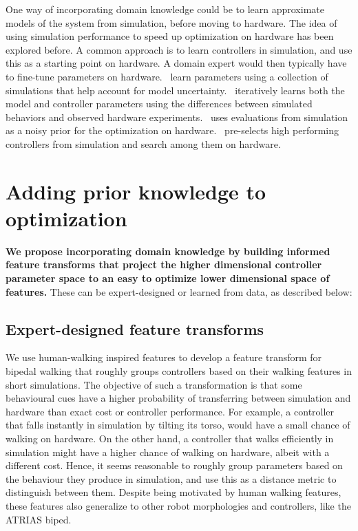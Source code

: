 One way of incorporating domain knowledge could be to learn approximate models of the system from simulation, before moving to hardware. The idea of using simulation performance to speed up optimization on hardware has been explored before. A common approach is to learn controllers in simulation, and use this as a starting point on hardware. A domain expert would then typically have to fine-tune parameters on hardware. \cite{mordatch2015ensemble}~learn parameters using a collection of simulations that help account for model uncertainty. \cite{ha2015reducing}~iteratively learns both the model and controller parameters using the differences between simulated behaviors and observed hardware experiments. 
 \cite{marco2017virtual}~uses evaluations from simulation as a noisy prior for the optimization on hardware. \cite{cully2015robots}~pre-selects high performing controllers from simulation and search among them on hardware. 
 
\section{Adding prior knowledge to optimization}

 \textbf{We propose incorporating domain knowledge by building informed feature transforms that project the higher dimensional controller parameter space to an easy to optimize lower dimensional space of features.} These can be expert-designed or learned from data, as described below:
 
 \subsection{Expert-designed feature transforms}
 We use human-walking inspired features to develop a feature transform for bipedal walking that roughly groups controllers based on their walking features in short simulations. The objective of such a transformation is that some behavioural cues have a higher probability of transferring between simulation and hardware than exact cost or controller performance. For example, a controller that falls instantly in simulation by tilting its torso, would have a small chance of walking on hardware. On the other hand, a controller that walks efficiently in simulation might have a higher chance of walking on hardware, albeit with a different cost. Hence, it seems reasonable to roughly group parameters based on the behaviour they produce in simulation, and use this as a distance metric to distinguish between them. Despite being motivated by human walking features, these features also generalize to other robot morphologies and controllers, like the ATRIAS biped. 
